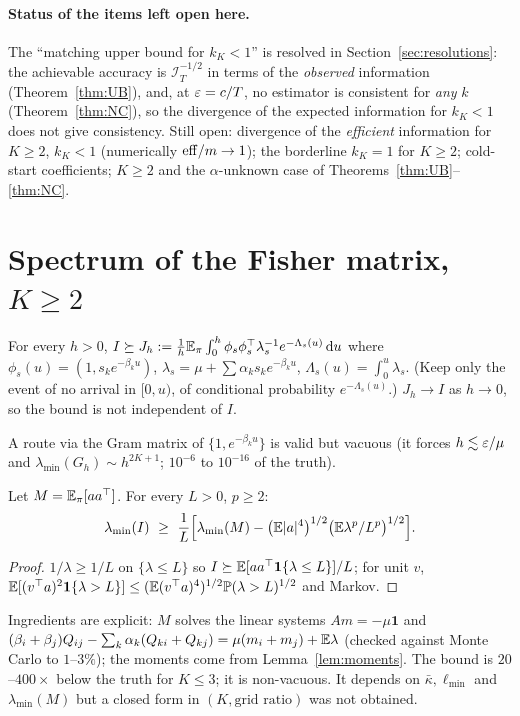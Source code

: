 \paragraph{Status of the items left open here.} The ``matching upper bound for $k_K<1$'' is resolved in Section~\ref{sec:resolutions}: the achievable accuracy is $\mathcal I_T^{-1/2}$ in terms of the \emph{observed} information (Theorem~\ref{thm:UB}), and, at $\varepsilon=c/T$, no estimator is consistent for \emph{any} $k$ (Theorem~\ref{thm:NC}), so the divergence of the expected information for $k_K<1$ does not give consistency. Still open: divergence of the \emph{efficient} information for $K\ge2$, $k_K<1$ (numerically $\mathrm{eff}/m\to1$); the borderline $k_K=1$ for $K\ge2$; cold-start coefficients; $K\ge2$ and the $\alpha$-unknown case of Theorems~\ref{thm:UB}--\ref{thm:NC}.

\section{Spectrum of the Fisher matrix, $K\ge2$}\label{sec:spectrum}

\begin{lemma}\label{lem:window}\Pt{}
For every $h>0$, $I\succeq J_h:=\frac1h\mathbb{E}_\pi\int_0^h\phi_s\phi_s^{\top}\lambda_s^{-1}e^{-\Lambda_s(u)}\,\mathrm d u$ where $\phi_s(u)=(1,s_ke^{-\beta_ku})$, $\lambda_s=\mu+\sum\alpha_ks_ke^{-\beta_ku}$, $\Lambda_s(u)=\int_0^u\lambda_s$.
(Keep only the event of no arrival in $[0,u)$, of conditional probability $e^{-\Lambda_s(u)}$.) $J_h\to I$ as $h\to0$, so the bound is not independent of $I$.
\end{lemma}
A route via the Gram matrix of $\{1,e^{-\beta_ku}\}$ is valid but vacuous (it forces $h\lesssim\varepsilon/\mu$ and $\lambda_{\min}(G_h)\sim h^{2K+1}$; $10^{-6}$ to $10^{-16}$ of the truth).

\begin{theorem}\label{thm:trunc}\Ps{}
Let $M=\mathbb{E}_\pi[aa^{\top}]$. For every $L>0$, $p\ge2$:
\[
\lambda_{\min}(I)\ \ge\ \frac1L\Big[\lambda_{\min}(M)-\big(\E|a|^4\big)^{1/2}\big(\E\lambda^p/L^p\big)^{1/2}\Big].
\]
\end{theorem}
\begin{proof}
$1/\lambda\ge1/L$ on $\{\lambda\le L\}$ so $I\succeq\mathbb{E}[aa^{\top}\mathbf 1\{\lambda\le L\}]/L$; for unit $v$, $\mathbb{E}[(v^{\top} a)^2\mathbf 1\{\lambda>L\}]\le(\mathbb{E}(v^{\top} a)^4)^{1/2}\mathbb{P}(\lambda>L)^{1/2}$ and Markov.
\end{proof}
Ingredients are explicit: $M$ solves the linear systems $Am=-\mu\mathbf1$ and $(\beta_i+\beta_j)Q_{ij}-\sum_k\alpha_k(Q_{ki}+Q_{kj})=\mu(m_i+m_j)+\mathbb{E}\lambda$ (checked against Monte Carlo to $1$--$3\%$); the moments come from Lemma~\ref{lem:moments}.
\Nt{} The bound is $20$--$400\times$ below the truth for $K\le3$; it is non-vacuous. It depends on $\bar\kappa,\ell_{\min}$ and $\lambda_{\min}(M)$ but a closed form in $(K,\text{grid ratio})$ was not obtained.

